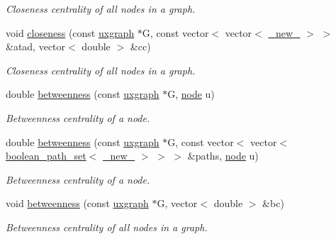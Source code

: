 \begin{DoxyCompactItemize}
\begin{DoxyCompactList}\small\item\em Closeness centrality of all nodes in a graph. \end{DoxyCompactList}\item 
void \hyperlink{namespacelgraph_1_1networks_1_1metrics_1_1centralities_aa98251b824fed2baa439258fae6dcc48}{closeness} (const \hyperlink{classlgraph_1_1utils_1_1uxgraph}{uxgraph} $\ast$G, const vector$<$ vector$<$ \hyperlink{namespacelgraph_1_1utils_a2c84bfde888c42ab3ad6b2cb8a364240}{\+\_\+new\+\_\+} $>$ $>$ \&atad, vector$<$ double $>$ \&cc)
\begin{DoxyCompactList}\small\item\em Closeness centrality of all nodes in a graph. \end{DoxyCompactList}\item 
double \hyperlink{namespacelgraph_1_1networks_1_1metrics_1_1centralities_a0834cb72864b1bdf574c212c5cafbce9}{betweenness} (const \hyperlink{classlgraph_1_1utils_1_1uxgraph}{uxgraph} $\ast$G, \hyperlink{namespacelgraph_1_1utils_a7bd66ede3805ef121bc2835bd48de0cf}{node} u)
\begin{DoxyCompactList}\small\item\em Betweenness centrality of a node. \end{DoxyCompactList}\item 
double \hyperlink{namespacelgraph_1_1networks_1_1metrics_1_1centralities_a2fb3b0c2d3cc9e44b7a979478d9e4d05}{betweenness} (const \hyperlink{classlgraph_1_1utils_1_1uxgraph}{uxgraph} $\ast$G, const vector$<$ vector$<$ \hyperlink{namespacelgraph_1_1utils_aaf50131e15d771a45620336d6e7a77f8}{boolean\+\_\+path\+\_\+set}$<$ \hyperlink{namespacelgraph_1_1utils_a2c84bfde888c42ab3ad6b2cb8a364240}{\+\_\+new\+\_\+} $>$ $>$ $>$ \&paths, \hyperlink{namespacelgraph_1_1utils_a7bd66ede3805ef121bc2835bd48de0cf}{node} u)
\begin{DoxyCompactList}\small\item\em Betweenness centrality of a node. \end{DoxyCompactList}\item 
void \hyperlink{namespacelgraph_1_1networks_1_1metrics_1_1centralities_a8ef4d17ff1a5e329f7d1fc1f5d1b13c9}{betweenness} (const \hyperlink{classlgraph_1_1utils_1_1uxgraph}{uxgraph} $\ast$G, vector$<$ double $>$ \&bc)
\begin{DoxyCompactList}\small\item\em Betweenness centrality of all nodes in a graph. \end{DoxyCompactList}\item 

\end{DoxyCompactItemize}
